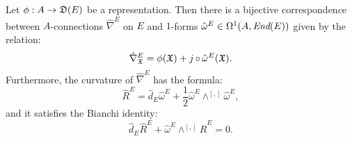 \begin{theorem}
Let $\phi:A \to \alg D(E)$ be a representation. Then there is a bijective correspondence between $A$-connections $\hat \nabla^E$ on $E$ and $1$-forms $\hat \omega^E \in \Omega^1(A, \operatorname{\textit{End}}(E))$ given by the relation:
\begin{equation}
    \hat \nabla^E_{\oid X} = \phi(\oid X) + j \comp \hat \omega^E(\oid X).
\end{equation}
Furthermore, the curvature of $\hat \nabla^E$ has the formula:
\begin{equation}
    \hat R^E = \hat d_E \hat \omega^E + \frac{1}{2} \hat \omega^E \wedge^{[,]} \hat \omega^E,
\end{equation}
and it satisfies the Bianchi identity:
\begin{equation}
    \hat d_E \hat R^E + \hat \omega^E \wedge^{[,]} \hat R^E = 0.
\end{equation}
\end{theorem}
